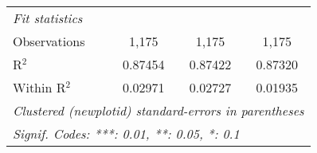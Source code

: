 \begin{table}[htbp]
\begin{tabular}{lccc}
      \midrule
      \emph{Fit statistics}\\
      Observations                       & 1,175           & 1,175           & 1,175\\  
      R$^2$                              & 0.87454         & 0.87422         & 0.87320\\  
      Within R$^2$                       & 0.02971         & 0.02727         & 0.01935\\  
      \midrule \midrule
      \multicolumn{4}{l}{\emph{Clustered (newplotid) standard-errors in parentheses}}\\
      \multicolumn{4}{l}{\emph{Signif. Codes: ***: 0.01, **: 0.05, *: 0.1}}\\
   \end{tabular}
\end{table}


